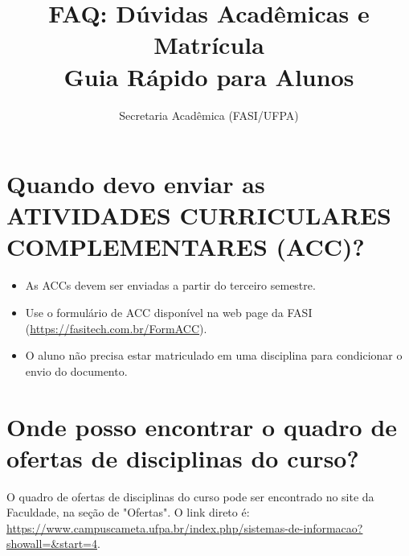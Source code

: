 \documentclass[12pt, a4paper]{article}
\title{FAQ: Dúvidas Acadêmicas e Matrícula\\ \large Guia Rápido para Alunos}
\author{Secretaria Acadêmica (FASI/UFPA)}
\date{} %
\begin{document}
\maketitle %

\section{Quando devo enviar as ATIVIDADES CURRICULARES COMPLEMENTARES (ACC)?}
\begin{itemize}
    \item As ACCs devem ser enviadas a partir do terceiro semestre.
    \item Use o formulário de ACC disponível na web page da FASI (\url{https://fasitech.com.br/FormACC}).
    \item O aluno não precisa estar matriculado em uma disciplina para condicionar o envio do documento.
\end{itemize}
\section{Onde posso encontrar o quadro de ofertas de disciplinas do curso?}
O quadro de ofertas de disciplinas do curso pode ser encontrado no site da Faculdade, na seção de "Ofertas".
O link direto é: \url{https://www.campuscameta.ufpa.br/index.php/sistemas-de-informacao?showall=&start=4}.
\end{document}
